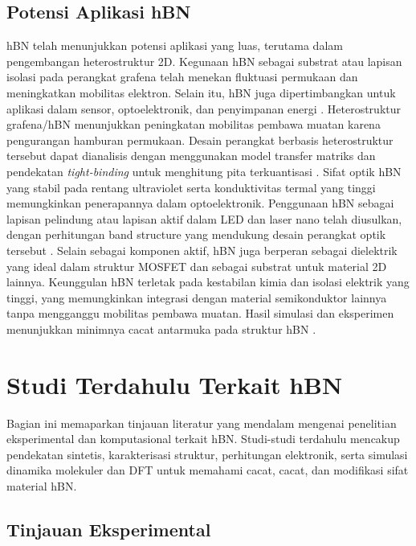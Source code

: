 \subsection{Potensi Aplikasi hBN}
hBN telah menunjukkan potensi aplikasi yang luas, terutama dalam pengembangan heterostruktur 2D.
Kegunaan hBN sebagai substrat atau lapisan isolasi pada perangkat grafena telah menekan fluktuasi permukaan dan meningkatkan mobilitas elektron.
Selain itu, hBN juga dipertimbangkan untuk aplikasi dalam sensor, optoelektronik, dan penyimpanan energi \citep{Wang2017}.
Heterostruktur grafena/hBN menunjukkan peningkatan mobilitas pembawa muatan karena pengurangan hamburan permukaan.
Desain perangkat berbasis heterostruktur tersebut dapat dianalisis dengan menggunakan model transfer matriks dan pendekatan \emph{tight-binding} untuk menghitung pita terkuantisasi \citep{CastroNeto2009}.
Sifat optik hBN yang stabil pada rentang ultraviolet serta konduktivitas termal yang tinggi memungkinkan penerapannya dalam optoelektronik.
Penggunaan hBN sebagai lapisan pelindung atau lapisan aktif dalam LED dan laser nano telah diusulkan, dengan perhitungan band structure yang mendukung desain perangkat optik tersebut \citep{Zhang2020}.
Selain sebagai komponen aktif, hBN juga berperan sebagai dielektrik yang ideal dalam struktur MOSFET dan sebagai substrat untuk material 2D lainnya.
Keunggulan hBN terletak pada kestabilan kimia dan isolasi elektrik yang tinggi, yang memungkinkan integrasi dengan material semikonduktor lainnya tanpa mengganggu mobilitas pembawa muatan.
Hasil simulasi dan eksperimen menunjukkan minimnya cacat antarmuka pada struktur hBN \citep{Bhimanapati2016}.

\section{Studi Terdahulu Terkait hBN}
Bagian ini memaparkan tinjauan literatur yang mendalam mengenai penelitian eksperimental dan komputasional terkait hBN.
Studi-studi terdahulu mencakup pendekatan sintetis, karakterisasi struktur, perhitungan elektronik, serta simulasi dinamika molekuler dan DFT untuk memahami cacat, cacat, dan modifikasi sifat material hBN.

\subsection{Tinjauan Eksperimental}

